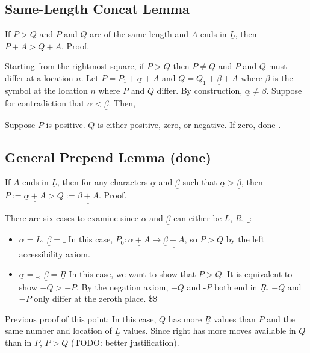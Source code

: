 \documentclass[11pt]{article}
\begin{document}
\subsection*{Same-Length Concat Lemma}
\label{sec:org78a6869}
If \(P > Q\) and \(P\) and \(Q\) are of the same length and \(A\) ends in \(\underline{L}\), then \(P + A > Q + A\).
Proof.

\bigskip
Starting from the rightmost square, if \(P > Q\) then \(P \not= Q\) and \(P\) and \(Q\) must differ at a location \(n\).
Let \(P = P_{1} + \underline{\alpha} + A\) and \(Q = Q_{1} + \underline{\beta} + A\) where \(\beta\) is the symbol at the location \(n\) where \(P\) and \(Q\) differ.
By construction, \(\underline{\alpha} \not= \underline{\beta}\).
Suppose for contradiction that \(\underline{\alpha} < \underline{\beta}\).
Then,

Suppose \(P\) is positive.
\(Q\) is either positive, zero, or negative.
If zero, done .

\subsection*{General Prepend Lemma (done)}
\label{sec:org16f51a2}
If \(A\) ends in \(\underline{L}\), then for any characters \(\underline{\alpha}\) and \(\underline{\beta}\) such that \(\underline{\alpha} > \underline{\beta}\), then \(P := \underline{\underline{\alpha} + A} > Q := \underline{\underline{\beta} + A}\). Proof.

There are six cases to examine since \(\underline{\alpha}\) and \(\underline{\beta}\) can either be
\(\underline{L}\), \(\underline{R}\), \(\_\):
\begin{itemize}
\item \(\underline{\alpha} = \underline{L}\), \(\underline{\beta} = \underline{\_}\)
In this case, \(P_{0}: \underline{\underline{\alpha} + A} \to \underline{\underline{\beta} + A}\), so
\(P > Q\) by the left accessibility axiom.

\item \(\underline{\alpha} = \underline{\_}\), \(\underline{\beta} = \underline{R}\)
In this case, we want to show that \(P > Q\).
It is equivalent to show \(-Q > -P\).
By the negation axiom, \(-Q\) and -\(P\) both end in \(\underline{R}\).
\(-Q\) and \(-P\) only differ at the zeroth place.
\$\$
\end{itemize}


Previous proof of this point:
In this case, \(Q\) has more \(\underline{R}\) values than \(P\) and the same number and location of \(\underline{L}\) values.
Since right has more moves available in \(Q\) than in \(P\), \(P > Q\) (TODO: better justification).
\end{document}
